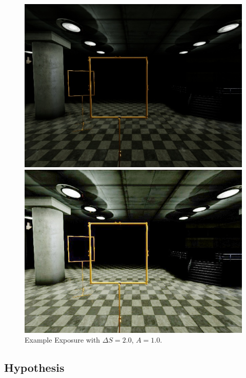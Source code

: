 \begin{figure}[htbp]
	\centering
	\begin{minipage}{0.49\textwidth}
		\includegraphics[width=\textwidth]{fig/gate_example}
	\end{minipage}
	\begin{minipage}{0.49\textwidth}
		\includegraphics[width=\textwidth]{fig/gate_example_exposure}
	\end{minipage}
	\caption{Example Exposure with $\Delta S = 2.0$, $A = 1.0$.}
	\label{fig:exposure}
\end{figure}

\subsection{Hypothesis}
\label{sec:training:hypothesis}

